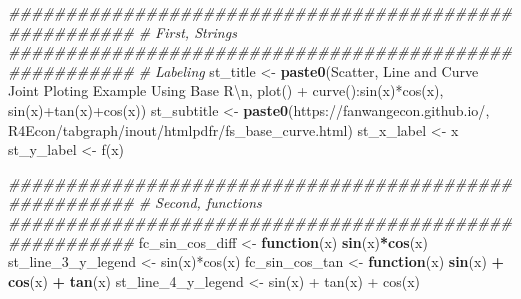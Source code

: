\documentclass[
]{book}
\newenvironment{Shaded}{\begin{snugshade}}{\end{snugshade}}
\newcommand{\CharTok}[1]{\textcolor[rgb]{0.31,0.60,0.02}{#1}}
\newcommand{\CommentTok}[1]{\textcolor[rgb]{0.56,0.35,0.01}{\textit{#1}}}
\newcommand{\ControlFlowTok}[1]{\textcolor[rgb]{0.13,0.29,0.53}{\textbf{#1}}}
\newcommand{\DecValTok}[1]{\textcolor[rgb]{0.00,0.00,0.81}{#1}}
\newcommand{\KeywordTok}[1]{\textcolor[rgb]{0.13,0.29,0.53}{\textbf{#1}}}
\newcommand{\NormalTok}[1]{#1}
\newcommand{\OperatorTok}[1]{\textcolor[rgb]{0.81,0.36,0.00}{\textbf{#1}}}
\newcommand{\StringTok}[1]{\textcolor[rgb]{0.31,0.60,0.02}{#1}}
\begin{document}
\begin{Shaded}
\begin{Highlighting}[]
\CommentTok{\#\#\#\#\#\#\#\#\#\#\#\#\#\#\#\#\#\#\#\#\#\#\#\#\#\#\#\#\#\#\#\#\#\#\#\#\#\#\#\#\#\#\#\#\#\#\#\#\#\#\#\#\#\#\#}
\CommentTok{\# First, Strings}
\CommentTok{\#\#\#\#\#\#\#\#\#\#\#\#\#\#\#\#\#\#\#\#\#\#\#\#\#\#\#\#\#\#\#\#\#\#\#\#\#\#\#\#\#\#\#\#\#\#\#\#\#\#\#\#\#\#\#}
\CommentTok{\# Labeling}
\NormalTok{st\_title \textless{}{-}}\StringTok{ }\KeywordTok{paste0}\NormalTok{(}\StringTok{\textquotesingle{}Scatter, Line and Curve Joint Ploting Example Using Base R}\CharTok{\textbackslash{}n}\StringTok{\textquotesingle{}}\NormalTok{,}
                   \StringTok{\textquotesingle{}plot() + curve():sin(x)*cos(x), sin(x)+tan(x)+cos(x)\textquotesingle{}}\NormalTok{)}
\NormalTok{st\_subtitle \textless{}{-}}\StringTok{ }\KeywordTok{paste0}\NormalTok{(}\StringTok{\textquotesingle{}https://fanwangecon.github.io/\textquotesingle{}}\NormalTok{,}
                      \StringTok{\textquotesingle{}R4Econ/tabgraph/inout/htmlpdfr/fs\_base\_curve.html\textquotesingle{}}\NormalTok{)}
\NormalTok{st\_x\_label \textless{}{-}}\StringTok{ \textquotesingle{}x\textquotesingle{}}
\NormalTok{st\_y\_label \textless{}{-}}\StringTok{ \textquotesingle{}f(x)\textquotesingle{}}

\CommentTok{\#\#\#\#\#\#\#\#\#\#\#\#\#\#\#\#\#\#\#\#\#\#\#\#\#\#\#\#\#\#\#\#\#\#\#\#\#\#\#\#\#\#\#\#\#\#\#\#\#\#\#\#\#\#\#}
\CommentTok{\# Second, functions}
\CommentTok{\#\#\#\#\#\#\#\#\#\#\#\#\#\#\#\#\#\#\#\#\#\#\#\#\#\#\#\#\#\#\#\#\#\#\#\#\#\#\#\#\#\#\#\#\#\#\#\#\#\#\#\#\#\#\#}
\NormalTok{fc\_sin\_cos\_diff \textless{}{-}}\StringTok{ }\ControlFlowTok{function}\NormalTok{(x) }\KeywordTok{sin}\NormalTok{(x)}\OperatorTok{*}\KeywordTok{cos}\NormalTok{(x)}
\NormalTok{st\_line\_}\DecValTok{3}\NormalTok{\_y\_legend \textless{}{-}}\StringTok{ \textquotesingle{}sin(x)*cos(x)\textquotesingle{}}
\NormalTok{fc\_sin\_cos\_tan \textless{}{-}}\StringTok{ }\ControlFlowTok{function}\NormalTok{(x) }\KeywordTok{sin}\NormalTok{(x) }\OperatorTok{+}\StringTok{ }\KeywordTok{cos}\NormalTok{(x) }\OperatorTok{+}\StringTok{ }\KeywordTok{tan}\NormalTok{(x)}
\NormalTok{st\_line\_}\DecValTok{4}\NormalTok{\_y\_legend \textless{}{-}}\StringTok{ \textquotesingle{}sin(x) + tan(x) + cos(x)\textquotesingle{}}


\end{Highlighting}
\end{Shaded}
\end{document}
